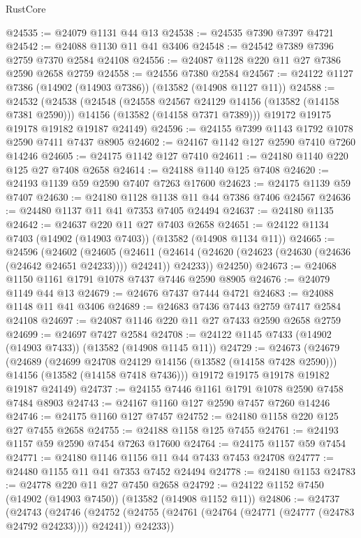 \begin{lexlean}{RustCore}
\begin{coremodule}
@24535 := @24079 @1131 @44 @13
@24538 := @24535 @7390 @7397 @4721
@24542 := @24088 @1130 @11 @41 @3406
@24548 := @24542 @7389 @7396 @2759 @7370 @2584 @24108
@24556 := @24087 @1128 @220 @11 @27 @7386 @2590 @2658 @2759
@24558 := @24556 @7380 @2584
@24567 := @24122 @1127 @7386 (@14902 (@14903 @7386)) (@13582 (@14908 @1127 @11))
@24588 := @24532
    (@24538
      (@24548
        (@24558 @24567 @24129 @14156 (@13582 (@14158 @7381 @2590)))
        @14156
        (@13582 (@14158 @7371 @7389)))
      @19172
      @19175
      @19178
      @19182
      @19187
      @24149)
@24596 := @24155 @7399 @1143 @1792 @1078 @2590 @7411 @7437 @8905
@24602 := @24167 @1142 @127 @2590 @7410 @7260 @14246
@24605 := @24175 @1142 @127 @7410
@24611 := @24180 @1140 @220 @125 @27 @7408 @2658
@24614 := @24188 @1140 @125 @7408
@24620 := @24193 @1139 @59 @2590 @7407 @7263 @17600
@24623 := @24175 @1139 @59 @7407
@24630 := @24180 @1128 @1138 @11 @44 @7386 @7406 @24567
@24636 := @24480 @1137 @11 @41 @7353 @7405 @24494
@24637 := @24180 @1135
@24642 := @24637 @220 @11 @27 @7403 @2658
@24651 := @24122 @1134 @7403 (@14902 (@14903 @7403)) (@13582 (@14908 @1134 @11))
@24665 := @24596
    (@24602
      (@24605
        (@24611 (@24614 (@24620 (@24623 (@24630 (@24636 (@24642 @24651 @24233)))) @24241)) @24233))
      @24250)
@24673 := @24068 @1150 @1161 @1791 @1078 @7437 @7446 @2590 @8905
@24676 := @24079 @1149 @44 @13
@24679 := @24676 @7437 @7444 @4721
@24683 := @24088 @1148 @11 @41 @3406
@24689 := @24683 @7436 @7443 @2759 @7417 @2584 @24108
@24697 := @24087 @1146 @220 @11 @27 @7433 @2590 @2658 @2759
@24699 := @24697 @7427 @2584
@24708 := @24122 @1145 @7433 (@14902 (@14903 @7433)) (@13582 (@14908 @1145 @11))
@24729 := @24673
    (@24679
      (@24689
        (@24699 @24708 @24129 @14156 (@13582 (@14158 @7428 @2590)))
        @14156
        (@13582 (@14158 @7418 @7436)))
      @19172
      @19175
      @19178
      @19182
      @19187
      @24149)
@24737 := @24155 @7446 @1161 @1791 @1078 @2590 @7458 @7484 @8903
@24743 := @24167 @1160 @127 @2590 @7457 @7260 @14246
@24746 := @24175 @1160 @127 @7457
@24752 := @24180 @1158 @220 @125 @27 @7455 @2658
@24755 := @24188 @1158 @125 @7455
@24761 := @24193 @1157 @59 @2590 @7454 @7263 @17600
@24764 := @24175 @1157 @59 @7454
@24771 := @24180 @1146 @1156 @11 @44 @7433 @7453 @24708
@24777 := @24480 @1155 @11 @41 @7353 @7452 @24494
@24778 := @24180 @1153
@24783 := @24778 @220 @11 @27 @7450 @2658
@24792 := @24122 @1152 @7450 (@14902 (@14903 @7450)) (@13582 (@14908 @1152 @11))
@24806 := @24737
    (@24743
      (@24746
        (@24752 (@24755 (@24761 (@24764 (@24771 (@24777 (@24783 @24792 @24233)))) @24241)) @24233))

\end{coremodule}
\end{lexlean}
